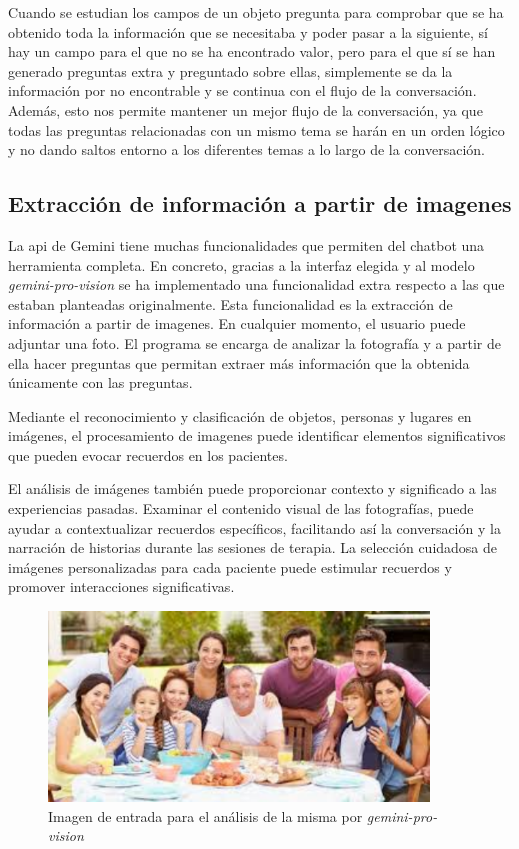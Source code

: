 Cuando se estudian los campos de un objeto pregunta para comprobar que se ha obtenido toda la información que se necesitaba y poder pasar a la siguiente, sí hay un campo para el que no se ha encontrado valor, pero para el que sí se han generado preguntas extra y preguntado sobre ellas, simplemente se da la información por no encontrable y se continua con el flujo de la conversación. Además, esto nos permite mantener un mejor flujo de la conversación, ya que todas las preguntas relacionadas con un mismo tema se harán en un orden lógico y no dando saltos entorno a los diferentes temas a lo largo de la conversación. 
\subsection{Extracción de información a partir de imagenes}
\label{sec:imagenes}
La api de Gemini tiene muchas funcionalidades que permiten del chatbot una herramienta completa. En concreto, gracias a la interfaz elegida y al modelo \textit{gemini-pro-vision} se ha implementado una funcionalidad extra respecto a las que estaban planteadas originalmente. Esta funcionalidad es la extracción de información a partir de imagenes. En cualquier momento, el usuario puede adjuntar una foto. El programa se encarga de analizar la fotografía y a partir de ella hacer preguntas que permitan extraer más información que la obtenida únicamente con las preguntas.

Mediante el reconocimiento y clasificación de objetos, personas y lugares en imágenes, el procesamiento de imagenes puede identificar elementos significativos que pueden evocar recuerdos en los pacientes. 

El análisis de imágenes también puede proporcionar contexto y significado a las experiencias pasadas. Examinar el contenido visual de las fotografías, puede ayudar a contextualizar recuerdos específicos, facilitando así la conversación y la narración de historias durante las sesiones de terapia. La selección cuidadosa de imágenes personalizadas para cada paciente puede estimular recuerdos y promover interacciones significativas. 

\begin{figure}[h]
	\centering
	\includegraphics[width=0.9\textwidth]{Imagenes/familia}
	\caption{Imagen de entrada para el análisis de la misma por \textit{gemini-pro-vision}}
	\label{img:familia}
\end{figure}

